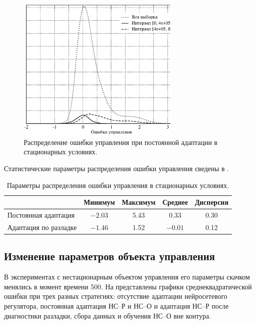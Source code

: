 \begin{figure}[h]
\centering
\includegraphics[width=0.7\textwidth,%
  height=0.3\textheight]{perm_adopt_distrib_rus}
\caption{Распределение ошибки управления при постоянной адаптации в
  стационарных условиях.}
\label{fig:perm_adopt_distrib_rus}
\end{figure}

Статистические параметры распределения ошибки управления сведены в
.

\begin{table}
  \caption{Параметры распределения ошибки управления в стационарных условиях.}
  \label{tabl:steady_state_distrib}
  \begin{tabular}{|l|c|c|c|c|}
    \hline
    & Минимум & Максимум & Среднее & Дисперсия\\
    \hline
    Постоянная адаптация&
    $-2.03$ & 5.43 & 0.33 & 0.30\\
    \hline
    Адаптация по разладке&
    $-1.46$ & 1.52 & $-0.01$ & 0.12\\
    \hline
  \end{tabular}
\end{table}

\subsection{Изменение параметров объекта управления}

В экспериментах с нестационарным объектом управления его параметры
скачком менялись в момент времени 500.  На
 представлены графики
среднеквадратической ошибки при трех разных стратегиях: отсутствие
адаптации нейросетевого регулятора, постоянная адаптация НС--Р и НС--О и
адаптация НС--Р после диагностики разладки, сбора данных и обучения
НС--О вне контура.

